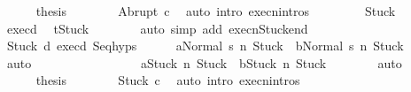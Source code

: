 \begin{isabellebody}
\isanewline
\ \ \ \ \isamarkupfalse%
\ {\isacharquery}thesis\isanewline
\ \ \ \ \ \ \isamarkupfalse%
\ Abrupt\ c{}\ \isamarkupfalse%
\ {\isacharparenleft}auto\ intro{\isacharcolon}\ execn{\isachardot}intros{\isacharparenright}\isanewline
\ \ \isamarkupfalse%
\isanewline
\ \ \ \ \isamarkupfalse%
\ Stuck\isanewline
\ \ \ \ \isamarkupfalse%
\ exec{\isacharunderscore}d{}\ \isamarkupfalse%
\ {\isachardoublequoteopen}t{\isacharequal}Stuck{\isachardoublequoteclose}\isanewline
\ \ \ \ \ \ \isamarkupfalse%
\ {\isacharparenleft}auto\ simp\ add{\isacharcolon}\ execn{\isacharunderscore}Stuck{\isacharunderscore}end{\isacharparenright}\isanewline
\ \ \ \ \isamarkupfalse%
\isanewline
\ \ \ \ \isamarkupfalse%
\ Stuck\ d{}\ exec{\isacharunderscore}d{}\ Seq{\isachardot}hyps\isanewline
\ \ \ \ \isamarkupfalse%
\ {\isachardoublequoteopen}{\isasymGamma}{\isasymturnstile}{\isasymlangle}a{}{\isacharcomma}Normal\ s{\isasymrangle}\ {\isacharequal}n{\isasymRightarrow}\ Stuck{\isachardoublequoteclose}\ \ {\isachardoublequoteopen}{\isasymGamma}{\isasymturnstile}{\isasymlangle}b{}{\isacharcomma}Normal\ s{\isasymrangle}\ {\isacharequal}n{\isasymRightarrow}\ Stuck{\isachardoublequoteclose}\isanewline
\ \ \ \ \ \ \isamarkupfalse%
\ auto\isanewline
\ \ \ \ \isamarkupfalse%
\isanewline
\ \ \ \ \isamarkupfalse%
\ \isanewline
\ \ \ \ \ \ {\isachardoublequoteopen}{\isasymGamma}{\isasymturnstile}{\isasymlangle}a{}{\isacharcomma}Stuck{\isasymrangle}\ {\isacharequal}n{\isasymRightarrow}\ Stuck{\isachardoublequoteclose}\ \ {\isachardoublequoteopen}{\isasymGamma}{\isasymturnstile}{\isasymlangle}b{}{\isacharcomma}Stuck{\isasymrangle}\ {\isacharequal}n{\isasymRightarrow}\ Stuck{\isachardoublequoteclose}\isanewline
\ \ \ \ \ \ \isamarkupfalse%
\ auto\isanewline
\ \ \ \ \isamarkupfalse%
\isanewline
\ \ \ \ \isamarkupfalse%
\ {\isacharquery}thesis\isanewline
\ \ \ \ \ \ \isamarkupfalse%
\ Stuck\ c{}\ \isamarkupfalse%
\ {\isacharparenleft}auto\ intro{\isacharcolon}\ execn{\isachardot}intros{\isacharparenright}\isanewline
\ \ \isamarkupfalse%
\isanewline
{}\isamarkupfalse%
\isanewline
\ \ \isamarkupfalse%

\end{isabellebody}
